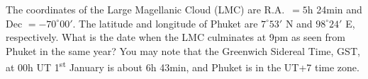 The coordinates of the Large Magellanic Cloud (LMC) are R.A.\ $= 5$h 24min and
Dec $= -70^\circ 00'$. The latitude and longitude of Phuket are $7^\circ 53'$ N
and $98^\circ 24'$ E, respectively. What is the date when the LMC culminates at
9pm as seen from Phuket in the same year? You may note that the Greenwich
Sidereal Time, GST, at 00h UT 1\textsuperscript{st} January is about 6h 43min,
and Phuket is in the UT+7 time zone.
